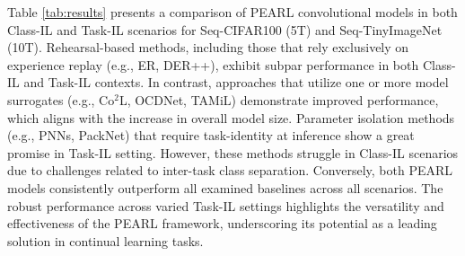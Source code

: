 \documentclass[10pt]{article} %
\begin{document}

Table \ref{tab:results} presents a comparison of PEARL convolutional models in both Class-IL and Task-IL scenarios for Seq-CIFAR100 (5T) and Seq-TinyImageNet (10T). Rehearsal-based methods, including those that rely exclusively on experience replay (e.g., ER, DER++), exhibit subpar performance in both Class-IL and Task-IL contexts. In contrast, approaches that utilize one or more model surrogates (e.g., Co$^{2}$L, OCDNet, TAMiL) demonstrate improved performance, which aligns with the increase in overall model size.
Parameter isolation methods (e.g., PNNs, PackNet) that require task-identity at inference show a great promise in Task-IL setting. However, these methods struggle in Class-IL scenarios due to challenges related to inter-task class separation. Conversely, both PEARL models consistently outperform all examined baselines across all scenarios. The robust performance across varied Task-IL settings highlights the versatility and effectiveness of the PEARL framework, underscoring its potential as a leading solution in continual learning tasks.




\end{document}
